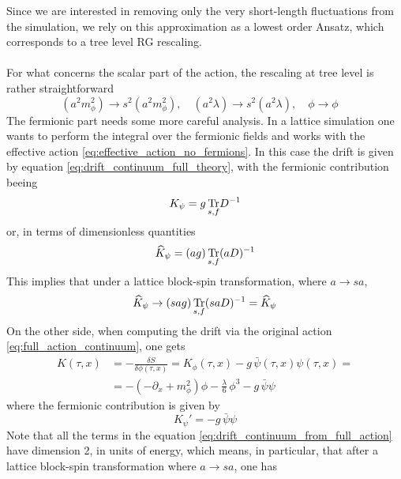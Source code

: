 Since we are interested in removing only the very short-length fluctuations from the simulation, we rely on this approximation as a lowest order Ansatz, which corresponds to a tree level RG rescaling. \\~\\
For what concerns the scalar part of the action, the rescaling at tree level is rather straightforward
\begin{equation*}
    (a^2m_\phi^2) \to s^2(a^2m_\phi^2), \quad (a^2\lambda) \to s^2 (a^2\lambda), \quad \phi \to \phi \quad
\end{equation*}
The fermionic part needs some more careful analysis. 
In a lattice simulation one wants to perform the integral over the fermionic fields and works with the effective action \eqref{eq:effective_action_no_fermions}. In this case the drift is given by equation \eqref{eq:drift_continuum_full_theory}, with the fermionic contribution beeing
\begin{equation}
    	K_{\psi} = g \, \underset{s,f}{\operatorname{\text{Tr}}}{D^{-1}}
	\label{eq:fermionic_drift_contribution}
\end{equation}
or, in terms of dimensionless quantities
\begin{equation*}
    \widehat{K}_{\psi} = (ag) \, \underset{s,f}{\operatorname{\text{Tr}}}{(aD)^{-1}}
\end{equation*}
This implies that under a lattice block-spin transformation, where $a \to sa$,
\begin{equation}
    \widehat{K}_{\psi} \to  (sag) \, \underset{s,f}{\operatorname{\text{Tr}}}{(saD)^{-1}} = \widehat{K}_{\psi}
    \label{eq:fermionic_rescaling_naive}
\end{equation}
On the other side, when computing the drift via the original action \eqref{eq:full_action_continuum}, one gets
\begin{equation}
    \begin{aligned}
        K(\tau, x) &= - \frac{\delta S}{\delta \phi(\tau, x)} = K_\phi(\tau, x) - g \, \bar\psi(\tau, x)\psi(\tau,x) = \\
        &= -\left(-\partial_x + m_\phi^2\right) \phi - \frac{\lambda}{6} \, \phi^3 - g \, \bar\psi\psi
    \end{aligned}
    \label{eq:drift_continuum_from_full_action}
\end{equation}
where the fermionic contribution is given by
\begin{equation*}
    K_{\psi}' = - g \, \bar\psi\psi
\end{equation*}
Note that all the terms in the equation \eqref{eq:drift_continuum_from_full_action} have dimension 2, in units of energy, which means, in particular, that after a lattice block-spin transformation where $a \to sa$, one has
